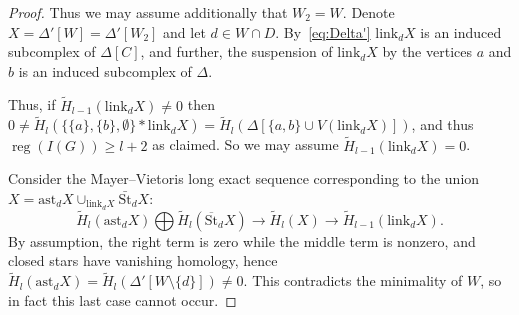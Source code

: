 \documentclass[10pt]{article}
\theoremstyle{definition}
\newtheorem{remark}[theorem]{Remark}
\numberwithin{equation}{section}
\newcommand \reg{\operatorname{reg}}
\newcommand \Vr{\operatorname{V}}
\begin{document}
\begin{proof}
Thus we may assume additionally that
$W_2=W$. 
Denote $X=\Delta'[W]=\Delta'[W_2]$ and let $d\in W\cap D$.
By~\eqref{eq:Delta'} $\text{link}_d X$ is an induced subcomplex of $\Delta[C]$, and further, the suspension of $\text{link}_d X$ by the vertices $a$ and $b$ is an induced
subcomplex of $\Delta$.

Thus, if
$\widetilde{H}_{l-1}(\text{link}_d X)\neq 0$
then
$0\neq \widetilde{H}_l (\{\{a\},\{b\},\emptyset\}*\text{link}_d X)=\widetilde{H}_l(\Delta[\{a,b\}\cup V(\text{link}_d X)])$, and thus $\reg(I(G))\ge l+2$ as claimed. 
So we may assume $\widetilde{H}_{l-1}(\text{link}_d X)=0$.


Consider the Mayer--Vietoris long exact sequence
corresponding to the union
$X=\text{ast}_d X\cup_{\text{link}_d X} \bar{\text{St}}_d X$:
$$\widetilde{H}_l (\text{ast}_{d} X) \bigoplus \widetilde{H}_l (\overline{\text{St}}_{d} X) \longrightarrow \widetilde{H}_l (X) \longrightarrow \widetilde{H}_{l-1} (\text{link}_d X).$$
By assumption, the right term is zero while the middle term is nonzero, and closed stars have vanishing homology, hence
$\widetilde{H}_l (\text{ast}_{d} X)=
\widetilde{H}_l (\Delta'[W\setminus\{d\}])\neq 0$.
This contradicts the minimality of $W$, so in fact this last case cannot occur.
\end{proof}

\end{document}
